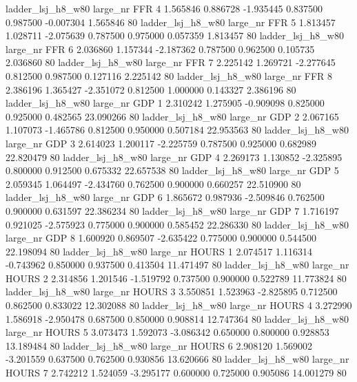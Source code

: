   ladder_lsj_h8_w80   large_nr      FFR                 4  1.565846  0.886728  -1.935445 0.837500 0.987500 -0.007304    1.565846 80
  ladder_lsj_h8_w80   large_nr      FFR                 5  1.813457  1.028711  -2.075639 0.787500 0.975000  0.057359    1.813457 80
  ladder_lsj_h8_w80   large_nr      FFR                 6  2.036860  1.157344  -2.187362 0.787500 0.962500  0.105735    2.036860 80
  ladder_lsj_h8_w80   large_nr      FFR                 7  2.225142  1.269721  -2.277645 0.812500 0.987500  0.127116    2.225142 80
  ladder_lsj_h8_w80   large_nr      FFR                 8  2.386196  1.365427  -2.351072 0.812500 1.000000  0.143327    2.386196 80
  ladder_lsj_h8_w80   large_nr      GDP                 1  2.310242  1.275905  -0.909098 0.825000 0.925000  0.482565   23.090266 80
  ladder_lsj_h8_w80   large_nr      GDP                 2  2.067165  1.107073  -1.465786 0.812500 0.950000  0.507184   22.953563 80
  ladder_lsj_h8_w80   large_nr      GDP                 3  2.614023  1.200117  -2.225759 0.787500 0.925000  0.682989   22.820479 80
  ladder_lsj_h8_w80   large_nr      GDP                 4  2.269173  1.130852  -2.325895 0.800000 0.912500  0.675332   22.657538 80
  ladder_lsj_h8_w80   large_nr      GDP                 5  2.059345  1.064497  -2.434760 0.762500 0.900000  0.660257   22.510900 80
  ladder_lsj_h8_w80   large_nr      GDP                 6  1.865672  0.987936  -2.509846 0.762500 0.900000  0.631597   22.386234 80
  ladder_lsj_h8_w80   large_nr      GDP                 7  1.716197  0.921025  -2.575923 0.775000 0.900000  0.585452   22.286330 80
  ladder_lsj_h8_w80   large_nr      GDP                 8  1.600920  0.869507  -2.635422 0.775000 0.900000  0.544500   22.198094 80
  ladder_lsj_h8_w80   large_nr    HOURS                 1  2.074517  1.116314  -0.743962 0.850000 0.937500  0.413504   11.471497 80
  ladder_lsj_h8_w80   large_nr    HOURS                 2  2.314856  1.201546  -1.519792 0.737500 0.900000  0.522789   11.773824 80
  ladder_lsj_h8_w80   large_nr    HOURS                 3  3.550851  1.523963  -2.825895 0.712500 0.862500  0.833022   12.302088 80
  ladder_lsj_h8_w80   large_nr    HOURS                 4  3.272990  1.586918  -2.950478 0.687500 0.850000  0.908814   12.747364 80
  ladder_lsj_h8_w80   large_nr    HOURS                 5  3.073473  1.592073  -3.086342 0.650000 0.800000  0.928853   13.189484 80
  ladder_lsj_h8_w80   large_nr    HOURS                 6  2.908120  1.569002  -3.201559 0.637500 0.762500  0.930856   13.620666 80
  ladder_lsj_h8_w80   large_nr    HOURS                 7  2.742212  1.524059  -3.295177 0.600000 0.725000  0.905086   14.001279 80
